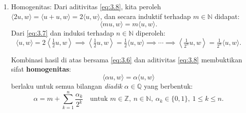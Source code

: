 \documentclass[aspectratio=169,11pt]{beamer}
\theoremstyle{definition}
\newcommand{\N}{\mathbb{N}}
\newcommand{\Z}{\mathbb{Z}}
\begin{document}
\begin{frame}[allowframebreaks]{\insertsection}{\insertsubsection}
\begin{itemize}
\begin{enumerate}
            \item Homogenitas: Dari aditivitas \eqref{eq:3.8}, kita peroleh $\langle 2u,w \rangle = \langle u+u, w \rangle = 2\langle u,w \rangle$, dan secara induktif terhadap $m \in \N$ didapat:
                  \begin{equation*}
                    \langle mu, w \rangle = m\langle u,w \rangle.
                  \end{equation*}
                  Dari \eqref{eq:3.7} dan induksi terhadap $n \in \N$ diperoleh:
                  \begin{equation*}
                    \langle u,w \rangle = 2 \left\langle \tfrac{1}{2}u, w \right\rangle \implies \left\langle \tfrac{1}{2}u, w \right\rangle = \tfrac{1}{2}\langle u,w \rangle \implies \cdots \implies \left\langle \tfrac{1}{2^n}u, w \right\rangle = \tfrac{1}{2^n}\langle u,w \rangle.
                  \end{equation*}

                  Kombinasi hasil di atas bersama \eqref{eq:3.6} dan aditivitas \eqref{eq:3.8} membuktikan sifat \textbf{homogenitas}:
                  \begin{equation}
                    \langle \alpha u, w \rangle = \alpha \langle u, w \rangle \label{eq:3.9}
                  \end{equation}
                  berlaku untuk semua bilangan \textit{diadik} $\alpha \in \mathbb{Q}$ yang berbentuk:
                  \begin{equation*}
                    \alpha = m + \sum_{k=1}^n \frac{\alpha_k}{2^k} \quad \text{untuk } m \in \Z,\ n \in \N,\ \alpha_k \in \{0,1\},\ 1 \leq k \leq n.
                  \end{equation*}


\end{enumerate}
\end{itemize}
\end{frame}
\end{document}
